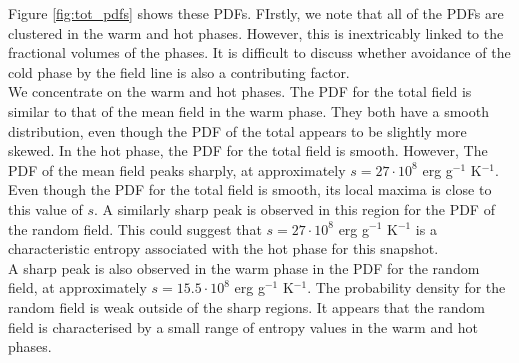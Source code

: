 \documentclass[useAMS,usenatbib]{mn2e}
\begin{document}
%


Figure \vref{fig:tot_pdfs} shows these PDFs. FIrstly, we note that all of the PDFs are clustered in the warm and hot phases. However, this is inextricably linked to the fractional volumes of the phases. It is difficult to discuss whether avoidance of the cold phase by the field line is also a contributing factor.\\
We concentrate on the warm and hot phases. The PDF for the total field is similar to that of the mean field in the warm phase. They both have a smooth distribution, even though the PDF of the total appears to be slightly more skewed. In the hot phase, the PDF for the total field is smooth. However, The PDF of the mean field peaks sharply, at approximately $s=27\cdot10^8$ erg g$^{-1}$ K$^{-1}$. Even though the PDF for the total field is smooth, its local maxima is close to this value of $s$. A similarly sharp peak is observed in this region for the PDF of the random field. This could suggest that $s=27\cdot10^8$ erg g$^{-1}$ K$^{-1}$ is a characteristic entropy associated with the hot phase for this snapshot. \\
A sharp peak is also observed in the warm phase in the PDF for the random field, at approximately $s=15.5\cdot10^8$ erg g$^{-1}$ K$^{-1}$. The probability density for the random field is weak outside of the sharp regions. It appears that the random field is characterised by a small range of entropy values in the warm and hot phases. 
\end{document}
